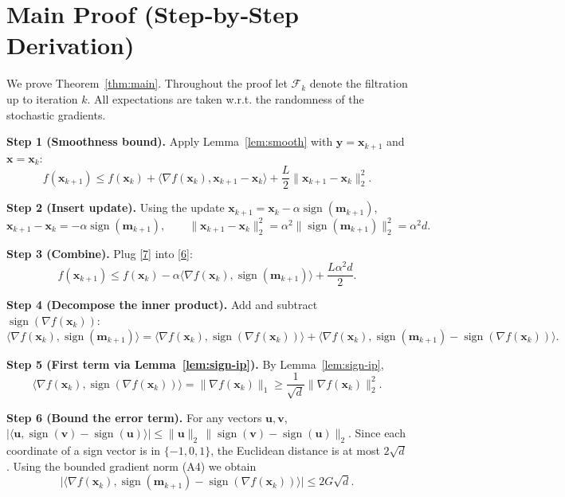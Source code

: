 \documentclass{article}
\newcommand{\sign}{\operatorname{sign}}
\begin{document}
\newpage
\section*{Main Proof (Step‑by‑Step Derivation)}
We prove Theorem~\ref{thm:main}. Throughout the proof let $\mathcal{F}_{k}$ denote the filtration up to iteration $k$.
All expectations are taken w.r.t. the randomness of the stochastic gradients.

\noindent\textbf{Step 1 (Smoothness bound).}  
Apply Lemma~\ref{lem:smooth} with $\bm{y}=\bm{x}_{k+1}$ and $\bm{x}=\bm{x}_{k}$:
\[
f(\bm{x}_{k+1})\le f(\bm{x}_{k})+\langle\nabla f(\bm{x}_{k}),\bm{x}_{k+1}-\bm{x}_{k}\rangle+\frac{L}{2}\|\bm{x}_{k+1}-\bm{x}_{k}\|_{2}^{2}. \tag{6}
\]

\noindent\textbf{Step 2 (Insert update).}  
Using the update $\bm{x}_{k+1}=\bm{x}_{k}-\alpha\sign(\bm{m}_{k+1})$,
\[
\bm{x}_{k+1}-\bm{x}_{k}= -\alpha\sign(\bm{m}_{k+1}),\qquad
\|\bm{x}_{k+1}-\bm{x}_{k}\|_{2}^{2}= \alpha^{2}\|\sign(\bm{m}_{k+1})\|_{2}^{2}= \alpha^{2}d. \tag{7}
\]

\noindent\textbf{Step 3 (Combine).}  
Plug \eqref{7} into \eqref{6}:
\[
f(\bm{x}_{k+1})\le f(\bm{x}_{k}) -\alpha\langle\nabla f(\bm{x}_{k}),\sign(\bm{m}_{k+1})\rangle+\frac{L\alpha^{2}d}{2}. \tag{8}
\]

\noindent\textbf{Step 4 (Decompose the inner product).}  
Add and subtract $\sign(\nabla f(\bm{x}_{k}))$:
\[
\langle\nabla f(\bm{x}_{k}),\sign(\bm{m}_{k+1})\rangle
= \langle\nabla f(\bm{x}_{k}),\sign(\nabla f(\bm{x}_{k}))\rangle
+ \langle\nabla f(\bm{x}_{k}),\sign(\bm{m}_{k+1})-\sign(\nabla f(\bm{x}_{k}))\rangle. \tag{9}
\]

\noindent\textbf{Step 5 (First term via Lemma~\ref{lem:sign-ip}).}  
By Lemma~\ref{lem:sign-ip},
\[
\langle\nabla f(\bm{x}_{k}),\sign(\nabla f(\bm{x}_{k}))\rangle
= \|\nabla f(\bm{x}_{k})\|_{1}\ge \frac{1}{\sqrt{d}}\|\nabla f(\bm{x}_{k})\|_{2}^{2}. \tag{10}
\]

\noindent\textbf{Step 6 (Bound the error term).}  
For any vectors $\bm{u},\bm{v}$,
$|\langle\bm{u},\sign(\bm{v})-\sign(\bm{u})\rangle|\le \|\bm{u}\|_{2}\,\|\sign(\bm{v})-\sign(\bm{u})\|_{2}$.  
Since each coordinate of a sign vector is in $\{-1,0,1\}$, the Euclidean distance is at most $2\sqrt{d}$. Using the bounded gradient norm (A4) we obtain
\[
\big|\langle\nabla f(\bm{x}_{k}),\sign(\bm{m}_{k+1})-\sign(\nabla f(\bm{x}_{k}))\rangle\big|
\le 2G\sqrt{d}. \tag{11}
\]
\end{document}
